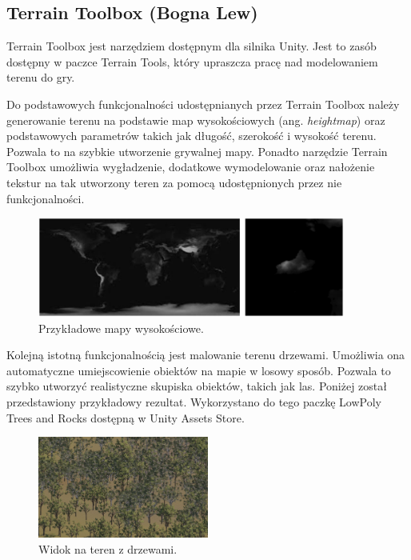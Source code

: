 \subsection{Terrain Toolbox (Bogna Lew)}\label{ss:tTool}
Terrain Toolbox jest narzędziem dostępnym dla silnika Unity. Jest to zasób dostępny w paczce Terrain Tools, który
upraszcza pracę nad modelowaniem terenu do gry.

Do podstawowych funkcjonalności udostępnianych przez Terrain Toolbox należy generowanie terenu na podstawie
map wysokościowych (ang. \textit{heightmap}) oraz podstawowych parametrów takich jak długość, szerokość i wysokość terenu.
Pozwala to na szybkie utworzenie grywalnej mapy. Ponadto narzędzie Terrain Toolbox umożliwia wygładzenie, dodatkowe
wymodelowanie oraz nałożenie tekstur na tak utworzony teren za pomocą udostępnionych przez nie funkcjonalności.

\begin{figure}[h!]
    \centering
    \includegraphics[width=0.9\textwidth]{images/modelowanie_terenu/przykladowe_heightmapy.jpg}
    \caption{Przykładowe mapy wysokościowe.}
\end{figure}

Kolejną istotną funkcjonalnością jest malowanie terenu drzewami. Umożliwia ona automatyczne umiejscowienie obiektów na
mapie w losowy sposób. Pozwala to szybko utworzyć realistyczne skupiska obiektów, takich jak las. Poniżej
został przedstawiony przykładowy rezultat. Wykorzystano do tego paczkę LowPoly Trees and Rocks dostępną w Unity
Assets Store.

\begin{figure}[h!]
    \centering
    \includegraphics[width=0.5\textwidth]{images/modelowanie_terenu/drzewa.jpg}
    \caption{Widok na teren z drzewami.}
\end{figure}
